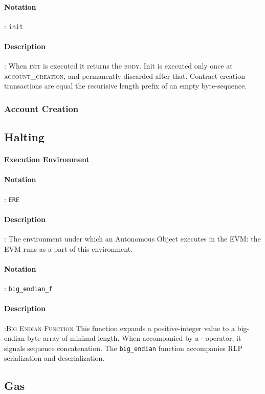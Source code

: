 \documentclass[10pt,a4paper,leqno,bibliography=totoc]{scrartcl}
\newenvironment{alphafootnotes}
{\par\edef\savedfootnotenumber{\number\value{footnote}}
\renewcommand{\thefootnote}{\alph{footnote}}
\setcounter{footnote}{0}}
{\par\setcounter{footnote}{\savedfootnotenumber}}
\begin{document}
\begin{alphafootnotes}
\begin{multicols*}{2}
				\paragraph{Notation}: \texttt{init}
				\paragraph{Description}: When \textsc{init} is executed it returns the \textsc{body}. Init is executed only once at \textsc{account\_creation}, and permanently discarded after that. 				Contract creation transactions are equal the recurisive length prefix of an empty byte-sequence. 		
			\subsubsection{Account Creation}
			
			\subsection{Halting}
				\paragraph{Execution Environment}
					\paragraph{Notation}: \texttt{ERE}
					\paragraph{Description}: The environment under which an Autonomous Object executes in the EVM: the EVM runs as a part of this environment.  

				\paragraph{Notation}: \texttt{big\_endian\_f}
				\paragraph{Description}:\textsc{Big Endian Function} This function expands a positive-integer value to a big-endian byte array of minimal length. When accompanied by a $\cdot$ operator, it signals sequence concatenation. The \texttt{big\_endian} function  accompanies RLP serialization and deserialization.

			\subsection{Gas}

\end{multicols*}
\end{alphafootnotes}
\end{document}
